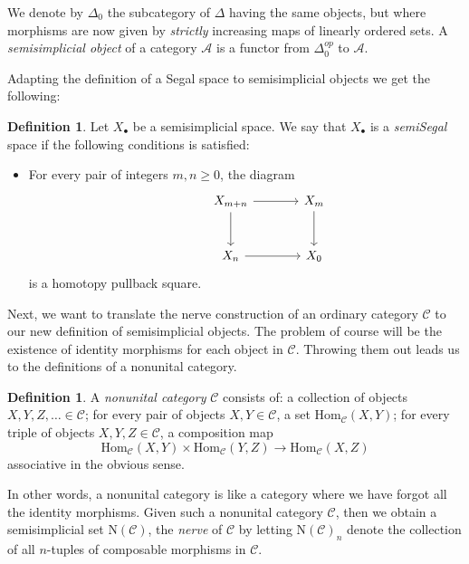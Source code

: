 \documentclass[a4paper,11pt]{article}
\newcommand{\Hom}{\mathrm{Hom}}
\newcommand{\acal}{\mathcal{A}}
\newcommand{\ccal}{\mathcal{C}}
\theoremstyle{plain}
\theoremstyle{definition}
\newtheorem{defi}[thm]{Definition}
\theoremstyle{remark}
\begin{document}
We denote by $\Delta_0$ the subcategory of $\Delta$ having the same objects, but where morphisms are now given by \textit{strictly} increasing maps of linearly ordered sets. A \textit{semisimplicial object} of a category $\acal$ is a functor from $\Delta_0^{op}$ to $\acal$. 

Adapting the definition of a Segal space to semisimplicial objects we get the following:

\begin{defi}
Let $X_{\bullet}$ be a semisimplicial space. We say that $X_{\bullet}$ is a \textit{semiSegal} space if the following conditions is satisfied: 
\begin{itemize}
    \item For every pair of integers $m, n \geq 0$, the diagram 
    \begin{equation*}
        \begin{tikzcd}[row sep = large, column sep = large]
        & X_{m+n} \arrow[r] \arrow[d] & X_m \arrow[d]\\
        & X_n \arrow[r] & X_0
        \end{tikzcd}
    \end{equation*}
    is a homotopy pullback square. 
\end{itemize}
\end{defi}

Next, we want to translate the nerve construction of an ordinary category $\ccal$ to our new definition of semisimplicial objects. The problem of course will be the existence of identity morphisms for each object in $\ccal$. Throwing them out leads us to the definitions of a nonunital category. 

\begin{defi}
A \textit{nonunital category} $\ccal$ consists of: a collection of objects $X, Y , Z , \dots \in \ccal$; for every pair of objects $X, Y \in \ccal$, a set $\Hom_{\ccal}(X,Y)$; for every triple of objects $X, Y, Z \in \ccal$, a composition map 
$$\Hom_{\ccal}(X,Y) \times \Hom_{\ccal}(Y,Z) \to \Hom_{\ccal}(X,Z)$$
associative in the obvious sense.
\end{defi}

In other words, a nonunital category is like a category where we have forgot all the identity morphisms. Given such a nonunital category $\ccal$, then we obtain a semisimplicial set $\mathrm{N}(\ccal)$, the \textit{nerve} of $\ccal$ by letting $\mathrm{N}(\ccal)_n$ denote the collection of all $n$-tuples of composable morphisms in $\ccal$. 
\end{document}
